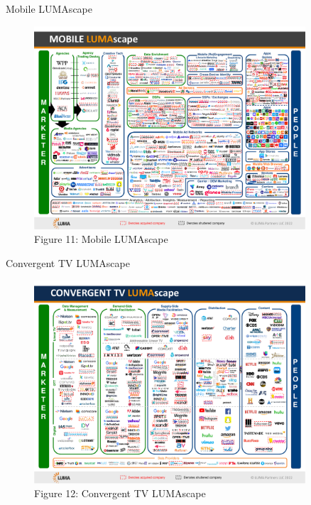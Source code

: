 \documentclass[pdf]{beamer}
\theoremstyle{remark}
\theoremstyle{definition}
\begin{document}
\begin{frame}[t]{Mobile LUMAscape}
\begin{figure}[htbp]
    \centering
    \captionsetup{justification=centering}
    \includegraphics[clip, trim=0cm 0.2cm 0cm 0.2cm, width=0.9\textwidth]{Images/Mobile_LUMAscape.pdf}  
     \caption{Figure {\color{franklinblue} 11}: Mobile LUMAscape}
    \label{fig:mobileluma}
\end{figure}

\end{frame}

\begin{frame}[t]{Convergent TV LUMAscape}
\begin{figure}[htbp]
    \centering
    \captionsetup{justification=centering}
    \includegraphics[clip, trim=0cm 0.2cm 0cm 0.2cm, width=0.9\textwidth]{Images/Convergent_TV_LUMAscape.pdf}  
     \caption{Figure {\color{franklinblue} 12}: Convergent TV LUMAscape}
    \label{fig:convergenttvluma}
\end{figure}
\end{frame}
\end{document}
